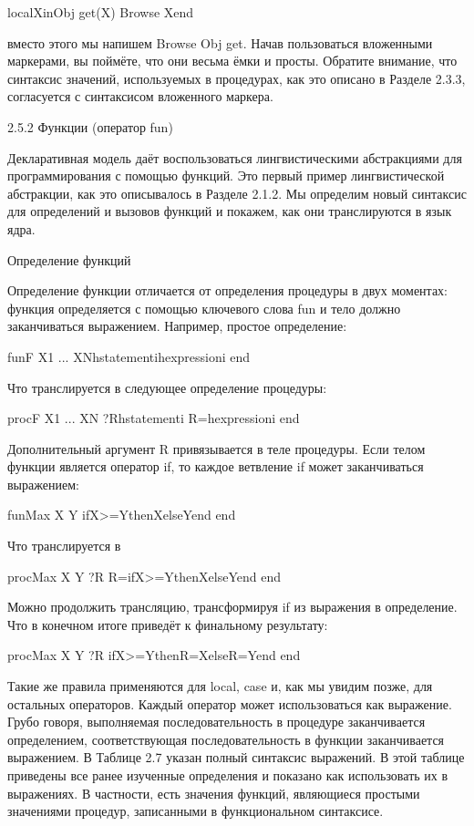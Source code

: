 localXin{Obj get(X)} {Browse X}end

вместо этого мы напишем {Browse {Obj get{}}}. Начав пользоваться вложенными маркерами, вы поймёте, что они весьма ёмки и просты. Обратите внимание, что синтаксис значений, используемых в процедурах, как это описано в Разделе 2.3.3, согласуется с синтаксисом вложенного маркера.

2.5.2 Функции (оператор fun)

Декларативная модель даёт воспользоваться лингвистическими абстракциями для программирования с помощью функций. Это первый пример лингвистической абстракции, как это описывалось в Разделе 2.1.2. Мы определим новый синтаксис для определений и вызовов функций и покажем, как они транслируются в язык ядра.

Определение функций

Определение функции отличается от определения процедуры в двух моментах: функция определяется с помощью ключевого слова fun и тело должно заканчиваться выражением. Например, простое определение:

fun{F X1 ... XN}hstatementihexpressioni end

Что транслируется в следующее определение процедуры:

proc{F X1 ... XN ?R}hstatementi R=hexpressioni end

Дополнительный аргумент R привязывается в теле процедуры. Если телом функции является оператор if, то каждое ветвление if может заканчиваться выражением:

fun{Max X Y}
ifX>=YthenXelseYend
end

Что транслируется в

proc{Max X Y ?R}
R=ifX>=YthenXelseYend
end

Можно продолжить трансляцию, трансформируя if из выражения в определение. Что в конечном итоге приведёт к финальному результату:

proc{Max X Y ?R}
ifX>=YthenR=XelseR=Yend
end

Такие же правила применяются для local, case и, как мы увидим позже, для остальных операторов. Каждый оператор может использоваться как выражение. Грубо говоря, выполняемая последовательность в процедуре заканчивается определением, соответствующая последовательность в функции заканчивается выражением. В Таблице 2.7 указан полный синтаксис выражений. В этой таблице приведены все ранее изученные определения и показано как использовать их в выражениях. В частности, есть значения функций, являющиеся простыми значениями процедур, записанными в функциональном синтаксисе.

